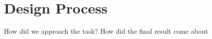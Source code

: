 \documentclass[../main/report.tex]{subfiles}
\begin{document}
\section{Design Process}

How did we approach the task?
How did the final result come about
\end{document}
